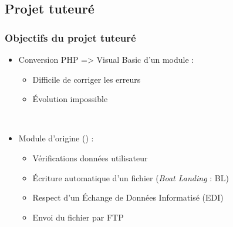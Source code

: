 \subsection{Projet tuteuré}

\begin{frame}
	\frametitle{Objectifs du projet tuteuré}
	
	\begin{itemize}
		\item Conversion PHP => Visual Basic d'un module :
			\begin{itemize}
				\item Difficile de corriger les erreurs
				\item \'Evolution impossible
			\end{itemize}~
			
		\item Module d'origine () :
			\begin{itemize}
				\item Vérifications données utilisateur\sautligne
				
				\item \'Ecriture automatique d'un fichier (\emph{Boat Landing} : BL)
				\item Respect d'un \'Echange de Données Informatisé (EDI)\sautligne
				
				\item Envoi du fichier par FTP
			\end{itemize}
	\end{itemize}
\end{frame}
